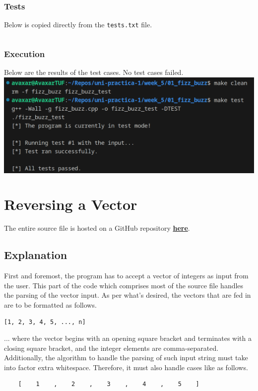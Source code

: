 \documentclass[12pt]{article}
\begin{document}
\subsubsection{Tests}
Below is copied directly from the \texttt{tests.txt} file.
\inputminted{text}{01_fizz_buzz/tests.txt}

\subsubsection{Execution}
Below are the results of the test cases. No test cases failed.
\newline\includegraphics[width=\textwidth]{01_fizz_buzz_test}

\pagebreak
\section{Reversing a Vector}
The entire source file is hosted on a GitHub repository \href{https://github.com/avaxar/uni-practica-1/tree/main/week_5/02_reversal}{\textbf{here}}.

\subsection{Explanation}

First and foremost, the program has to accept a vector of integers as input from the user. This part of the code which comprises most of the source file handles the parsing of the vector input. As per what's desired, the vectors that are fed in are to be formatted as follows.
\begin{verbatim}
[1, 2, 3, 4, 5, ..., n]
\end{verbatim}
... where the vector begins with an opening square bracket and terminates with a closing square bracket, and the integer elements are comma-separated. Additionally, the algorithm to handle the parsing of such input string must take into factor extra whitespace. Therefore, it must also handle cases like as follows.
\begin{verbatim}
    [    1    ,    2    ,    3    ,    4    ,    5    ]
\end{verbatim}
\end{document}
